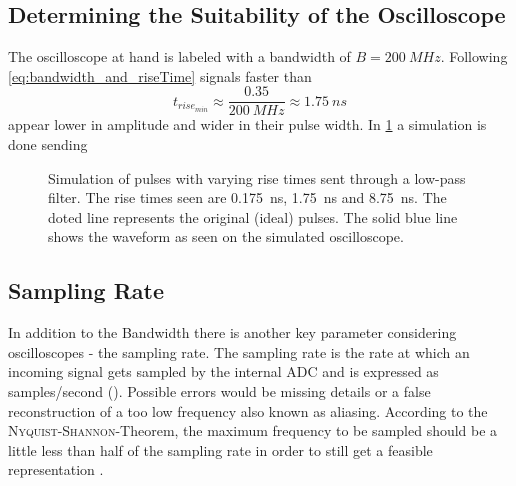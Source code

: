     \subsection{Determining the Suitability of the Oscilloscope}\label{sec:A5_oscopes_suitability}%
        The oscilloscope at hand is labeled with a bandwidth of \( B = \SI{200}{MHz} \). Following \cref{eq:bandwidth_and_riseTime}
        signals faster than
        \begin{equation}
            t_{rise_{min}} \approx \frac{0.35}{\SI{200}{MHz}} \approx \SI{1.75}{ns}
        \end{equation}
        appear lower in amplitude and wider in their pulse width. In \cref{fig:low-pass-simulation} a simulation is done
        sending 
        \begin{figure}[h]
            \centering
            
            \caption[Simulation of pulses with varying rise times]{Simulation of pulses with varying rise times sent through a low-pass filter. The rise times seen are \SI{0.175}{ns}, \SI{1.75}{ns} and \SI{8.75}{ns}.
            The doted line represents the original (ideal) pulses. The solid blue line shows the waveform as seen on the simulated oscilloscope.}
            \label{fig:low-pass-simulation}
        \end{figure}
    \subsection{Sampling Rate}\label{sec:A6:sampling_rate}%
    In addition to the Bandwidth there is another key parameter considering oscilloscopes - the sampling rate. The sampling rate
    is the rate at which an incoming signal gets sampled by the internal ADC and is expressed as samples/second (\SI{}{}). Possible
    errors would be missing details or a false reconstruction of a too low frequency also known as aliasing.
    According to the \textsc{Nyquist-Shannon}-Theorem, the maximum frequency to be sampled should be a little less than
    half of the sampling rate in order to still get a feasible representation \cite{Eichler.2016}. 

